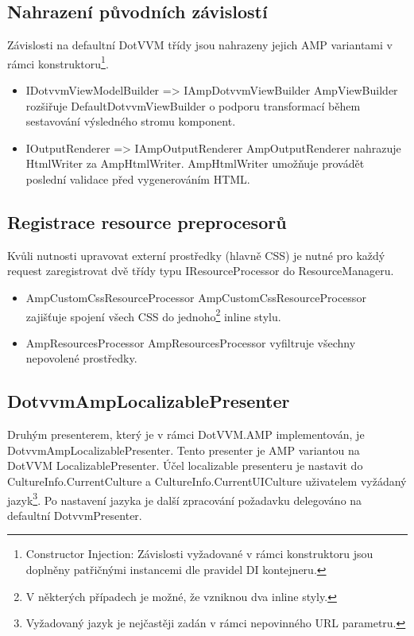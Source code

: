 \subsection*{Nahrazení původních závislostí}
Závislosti na defaultní DotVVM třídy jsou nahrazeny jejich AMP variantami v rámci konstruktoru\footnote{Constructor Injection: Závislosti vyžadované v rámci konstruktoru jsou doplněny patřičnými instancemi dle pravidel DI kontejneru.}.

\begin{itemize}
    \item IDotvvmViewModelBuilder => IAmpDotvvmViewBuilder \newline
    AmpViewBuilder rozšiřuje DefaultDotvvmViewBuilder o podporu transformací během sestavování výsledného stromu komponent.
    \item IOutputRenderer => IAmpOutputRenderer \newline
    AmpOutputRenderer nahrazuje HtmlWriter za AmpHtmlWriter. AmpHtmlWriter umožňuje provádět poslední validace před vygenerováním HTML.
\end{itemize}

\subsection*{Registrace resource preprocesorů}
Kvůli nutnosti upravovat externí prostředky (hlavně CSS) je nutné pro každý request zaregistrovat dvě třídy typu IResourceProcessor do ResourceManageru.
\begin{itemize}
    \item AmpCustomCssResourceProcessor \newline
    AmpCustomCssResourceProcessor zajišťuje spojení všech CSS do jednoho\footnote{V některých případech je možné, že vzniknou dva inline styly.} inline stylu.
    \item AmpResourcesProcessor \newline
    AmpResourcesProcessor vyfiltruje všechny nepovolené prostředky.
\end{itemize}

\subsection*{DotvvmAmpLocalizablePresenter}
Druhým presenterem, který je v rámci DotVVM.AMP implementován, je DotvvmAmpLocalizablePresenter. Tento presenter je AMP variantou na DotVVM LocalizablePresenter.
Účel localizable presenteru je nastavit do  CultureInfo.CurrentCulture a CultureInfo.CurrentUICulture uživatelem vyžádaný jazyk\footnote{Vyžadovaný jazyk je nejčastěji zadán v rámci nepovinného URL parametru.}. Po nastavení jazyka je další zpracování požadavku delegováno na defaultní DotvvmPresenter.

